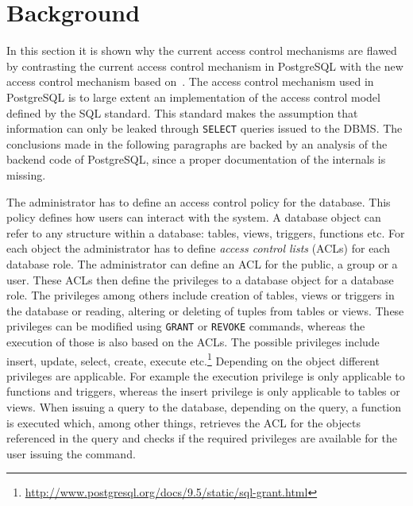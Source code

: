 \section{Background}

In this section it is shown why the current access control mechanisms are flawed by contrasting the current access control mechanism in PostgreSQL with the new access control mechanism based on~\cite{guarnieri2016strong}.
%
The access control mechanism used in PostgreSQL is to large extent an implementation of the access control model defined by the SQL standard.
%
This standard makes the assumption that information can only be leaked through \texttt{SELECT} queries issued to the DBMS.
%
The conclusions made in the following paragraphs are backed by an analysis of the backend code of PostgreSQL, since a proper documentation of the internals is missing.

The administrator has to define an access control policy for the database.
%
This policy defines how users can interact with the system.
%
A database object can refer to any structure within a database: tables, views, triggers, functions etc.
%
For each object the administrator has to define \emph{access control lists} (ACLs) for each database role.
%
The administrator can define an ACL for the public, a group or a user. 
%
These ACLs then define the privileges to a database object for a database role.
%
The privileges among others include creation of tables, views or triggers in the database or reading, altering or deleting of tuples from tables or views.
%
These privileges can be modified using \texttt{GRANT} or \texttt{REVOKE} commands, whereas the execution of those is also based on the ACLs.
%
The possible privileges include insert, update, select, create, execute etc.\footnote{\url{http://www.postgresql.org/docs/9.5/static/sql-grant.html}}
%
Depending on the object different privileges are applicable. 
%
For example the execution privilege is only applicable to functions and triggers, whereas the insert privilege is only applicable to tables or views.
%
When issuing a query to the database, depending on the query, a function is executed which, among other things, retrieves the ACL for the objects referenced in the query and checks if the required privileges are available for the user issuing the command.


